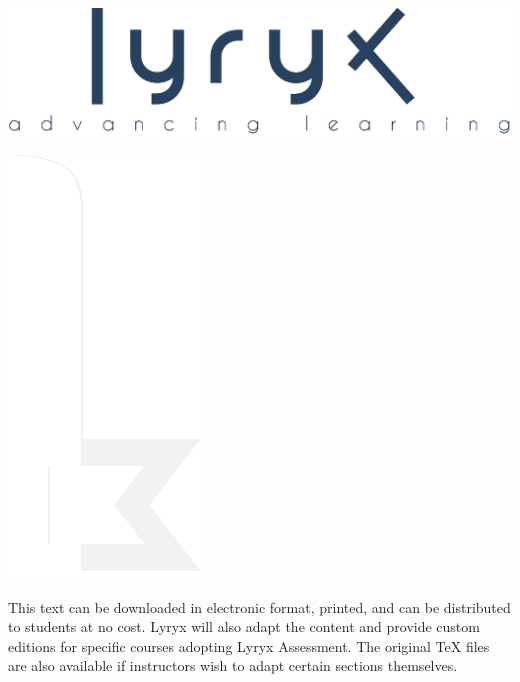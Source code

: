 \setlength{\parskip}{0pt}
\thispagestyle{empty}


\vspace{-3em}
\begin{center}
	\includegraphics[width=.4\textwidth]{images/LyryxLogo.eps}
	
	\vspace{2em}
	\textcolor{lscstextcolour}{\textbf{\fontsize{20}{24}\selectfont {LYRYX WITH OPEN TEXTS}}}
\end{center}

\vspace{0.5em}
	
\begin{center}
\begin{lscshdrbox}
\includegraphics[scale=0.08]{images/component-book.eps}\hspace{14.35em}\textcolor{white}{\textbf{OPEN TEXT}}
\end{lscshdrbox}
\end{center}

\begin{center}
	\parbox{0.9\linewidth}{
		This text can be downloaded in electronic format, printed, and can be distributed
		to students at no cost. Lyryx will also adapt the
		content and provide custom editions for specific courses adopting
		Lyryx Assessment. The original TeX files are also available if instructors
		wish to adapt certain sections themselves.
	}
\end{center}

